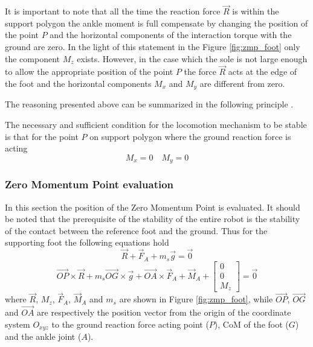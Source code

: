 It is important to note that all the time the reaction force $\vec{R}$ is within the support polygon
the ankle moment is full compensate by changing the position of the point $P$ and the horizontal
components of the interaction torque with the ground are zero. In the light of this statement in the
Figure \ref{fig:zmp_foot} only the component $M_z$ exists.
However, in the case which the sole is not large enough to allow the appropriate position of the
point $P$ the force $\vec{R}$ acts at the edge of the foot and the horizontal components $M_x$ and
$M_y$ are different from zero.
\par
The reasoning presented above can be summarized in the following principle \cite{Vukobratov2004}.
\begin{principle}
  The necessary and sufficient condition for the locomotion mechanism to be stable
  is that for the point $P$ on support polygon where the ground reaction force is acting
  \[
  M_x = 0 \quad M_y = 0
  \]
\end{principle}
\subsubsection{Zero Momentum Point evaluation}
In this section the position of the Zero Momentum Point is evaluated. It should be noted that the
prerequisite of the stability of the entire robot is the stability of the contact between the
reference foot and the ground. Thus for the supporting foot the following equations hold 
\[
\vec{R} + \vec{F}_A + m_s \vec{g} = \vec{0}
\]
\begin{equation}
  \label{eq:zmp_2_cardinal}
  \vec{OP} \times \vec{R} + m_s \vec{OG} \times \vec{g} + \vec{OA} \times \vec{F}_A + \vec{M}_A +
  \begin{bmatrix}
    0 \\
    0 \\
    M_z
  \end{bmatrix} = \vec{0}
\end{equation}
where $\vec{R}$, $M_z$, $\vec{F}_A$, $\vec{M}_A$ and $m_s$ are shown in Figure
\ref{fig:zmp_foot}, while $\vec{OP}$, $\vec{OG}$ and $\vec{OA}$ are respectively the position vector
from the origin of the coordinate system $O_{xyz}$ to the ground reaction force acting point ($P$),
CoM of the foot ($G$) and the ankle joint ($A$).
\par

